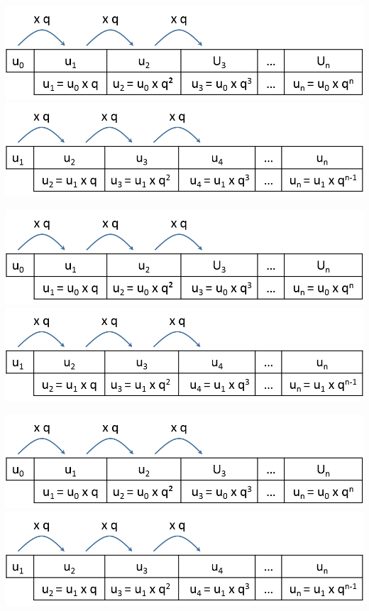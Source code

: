 \documentclass[12pt,a4paper]{article}
\begin{document}
\begin{multicols}{2}
	\includegraphics[scale=0.45]{./img/geo1}
	\includegraphics[scale=0.45]{./img/geo2}
\end{multicols}


\begin{multicols}{2}
	\includegraphics[scale=0.45]{./img/geo1}
	\includegraphics[scale=0.45]{./img/geo2}
\end{multicols}


\begin{multicols}{2}
	\includegraphics[scale=0.45]{./img/geo1}
	\includegraphics[scale=0.45]{./img/geo2}
\end{multicols}
\end{document}
